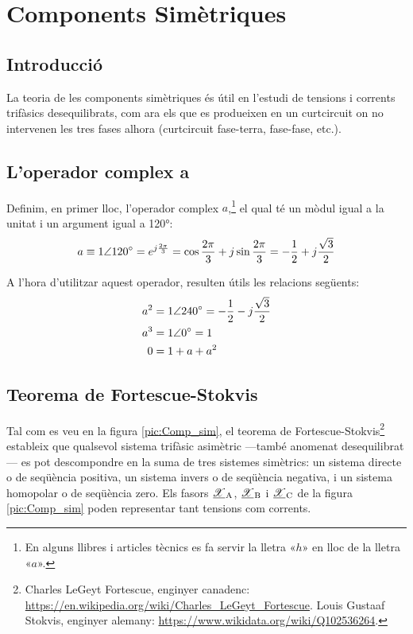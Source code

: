 
\chapter{Components Simètriques}  \label{sec:ch-comp-sim}

\section{Introducció}
La teoria de les components simètriques és útil en l'estudi de
tensions i corrents trifàsics
 desequilibrats, com ara els que es produeixen en un curtcircuit on no intervenen les tres
 fases alhora (curtcircuit fase-terra, fase-fase, etc.).

\section{L'operador complex a}

Definim, en primer lloc, l'operador complex $a$,\footnote{En alguns llibres i articles tècnics es fa servir la lletra «$h$» en lloc de la lletra «$a$».} el qual té un mòdul
igual a la unitat i un argument igual a \ang{120}: \begin{equation}
   a \equiv \complexnum{1:120} = e^{j\frac{2\pi}{3}} =
   \cos \frac{2\pi}{3} + j \sin \frac{2\pi}{3} = - \frac{1}{2} + j \frac{\sqrt{3}}{2}
\end{equation}

A l'hora d'utilitzar aquest operador, resulten útils les relacions
següents:
\begin{subequations}
\begin{align}
    a^2 &= \complexnum{1:240}= - \frac{1}{2} - j \frac{\sqrt{3}}{2} \\
    a^3 &= \complexnum{1:0} = 1 \\
  	0 &=   1+ a + a^2 
 \end{align}
\end{subequations}

\section{\texorpdfstring{Teorema de Fortescue-Stokvis}{Teorema de Fortescue-Stokvis}}

Tal com es veu en la figura \vref{pic:Comp_sim}, el teorema de Fortescue-Stokvis\footnote{Charles LeGeyt Fortescue, enginyer canadenc: \href{https://en.wikipedia.org/wiki/Charles_LeGeyt_Fortescue}{https:/\!\!/en.wikipedia.org/wiki/Charles\_LeGeyt\_Fortescue}. Louis Gustaaf Stokvis, enginyer alemany: \href{https://www.wikidata.org/wiki/Q102536264}{https:/\!\!/www.wikidata.org/wiki/Q102536264}.}
estableix que qualsevol sistema trifàsic asimètric ---també anomenat
desequilibrat---  es pot descompondre  en la suma de tres sistemes
simètrics: un sistema directe o de seqüència positiva, un sistema
invers o de seqüència negativa, i un sistema homopolar o de
seqüència zero. Els fasors $\cmplx{\mathscr{X}}\ped{A}$,
$\cmplx{\mathscr{X}}\ped{B}$ i $\cmplx{\mathscr{X}}\ped{C}$ de la figura \ref{pic:Comp_sim} poden representar tant
tensions com corrents.

